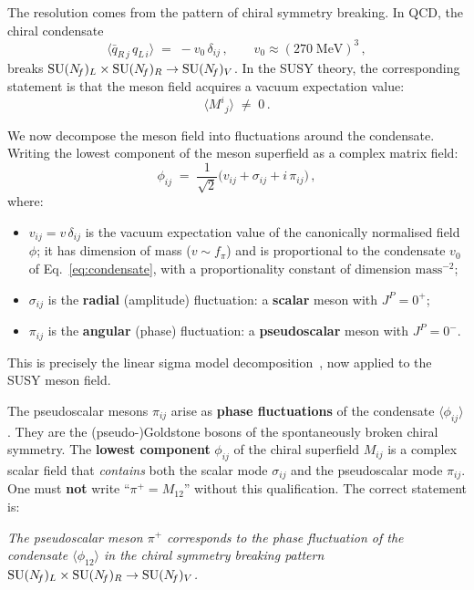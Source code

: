 \documentclass[11pt,a4paper]{article}
\newcommand{\fpi}{f_\pi}
\begin{document}
The resolution comes from the pattern of chiral symmetry breaking.
In QCD, the chiral condensate
\begin{equation}\label{eq:condensate}
  \langle \bar{q}_{R\,j}\, q_{L\,i} \rangle
  \;=\; -v_0\,\delta_{ij}\,,
  \qquad v_0 \approx (270\;\text{MeV})^3\,,
\end{equation}
breaks $\mathrm{SU}(N_{\!f})_L \times \mathrm{SU}(N_{\!f})_R \to \mathrm{SU}(N_{\!f})_V$.  In the SUSY
theory, the corresponding statement is that the meson field acquires
a vacuum expectation value:
\begin{equation}\label{eq:meson-vev}
  \langle M^i{}_j \rangle \;\neq\; 0\,.
\end{equation}

We now decompose the meson field into fluctuations around the
condensate.  Writing the lowest component of the meson superfield
as a complex matrix field:
\begin{equation}\label{eq:sigma-pi-decomp}
  \boxed{
  \phi_{ij}
  \;=\; \frac{1}{\sqrt{2}}\bigl(v_{ij} + \sigma_{ij} + i\,\pi_{ij}\bigr)\,,
  }
\end{equation}
where:
\begin{itemize}
  \item $v_{ij} = v\,\delta_{ij}$ is the vacuum expectation value of the
    canonically normalised field $\phi$; it has dimension of mass
    ($v \sim \fpi$) and is proportional to the condensate $v_0$ of
    Eq.~\eqref{eq:condensate}, with a proportionality constant of
    dimension $\text{mass}^{-2}$;
  \item $\sigma_{ij}$ is the \textbf{radial} (amplitude) fluctuation:
    a \textbf{scalar} meson with $J^P = 0^+$;
  \item $\pi_{ij}$ is the \textbf{angular} (phase) fluctuation:
    a \textbf{pseudoscalar} meson with $J^P = 0^-$.
\end{itemize}
This is precisely the linear sigma model
decomposition~\cite{GellMann1960}, now applied to the SUSY meson
field.

\begin{warningbox}[title={The pion is NOT the lowest component of $M$}]
The pseudoscalar mesons $\pi_{ij}$ arise as \textbf{phase fluctuations}
of the condensate $\langle \phi_{ij} \rangle$.  They are the
(pseudo-)Goldstone bosons of the spontaneously broken chiral symmetry.
The \textbf{lowest component} $\phi_{ij}$ of the chiral superfield
$M_{ij}$ is a complex scalar field that \emph{contains} both the scalar
mode $\sigma_{ij}$ and the pseudoscalar mode $\pi_{ij}$.  One must
\textbf{not} write ``$\pi^+ = M_{12}$'' without this qualification.
The correct statement is:

\medskip
\emph{The pseudoscalar meson $\pi^+$ corresponds to the phase
fluctuation of the condensate $\langle \phi_{12} \rangle$ in the
chiral symmetry breaking pattern $\mathrm{SU}(N_{\!f})_L \times \mathrm{SU}(N_{\!f})_R \to
\mathrm{SU}(N_{\!f})_V$.}
\end{warningbox}
\end{document}

